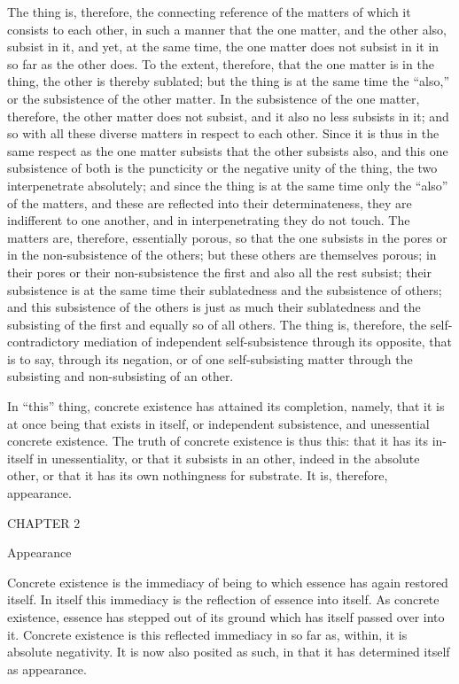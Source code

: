 The thing is, therefore, the connecting reference of the matters
of which it consists to each other, in such a manner
that the one matter, and the other also, subsist in it,
and yet, at the same time, the one matter does not subsist
in it in so far as the other does.
To the extent, therefore, that the one matter is in the thing,
the other is thereby sublated; but the thing is at the same
time the “also,” or the subsistence of the other matter.
In the subsistence of the one matter, therefore, the other matter does not subsist,
and it also no less subsists in it;
and so with all these diverse matters in respect to each other.
Since it is thus in the same respect as the one matter subsists that the
other subsists also, and this one subsistence of both is the puncticity or
the negative unity of the thing, the two interpenetrate absolutely;
and since the thing is at the same time only the “also” of the matters,
and these are reflected into their determinateness,
they are indifferent to one another, and
in interpenetrating they do not touch.
The matters are, therefore, essentially porous,
so that the one subsists in the pores
or in the non-subsistence of the others;
but these others are themselves porous;
in their pores or their non-subsistence
the first and also all the rest subsist;
their subsistence is at the same time
their sublatedness and the subsistence of others;
and this subsistence of the others is
just as much their sublatedness
and the subsisting of the first
and equally so of all others.
The thing is, therefore,
the self-contradictory mediation of
independent self-subsistence through its opposite,
that is to say, through its negation,
or of one self-subsisting matter
through the subsisting and non-subsisting of an other.

In “this” thing, concrete existence has attained its completion,
namely, that it is at once being that exists in itself,
or independent subsistence, and unessential concrete existence.
The truth of concrete existence is thus this:
that it has its in-itself in unessentiality,
or that it subsists in an other,
indeed in the absolute other,
or that it has its own nothingness for substrate.
It is, therefore, appearance.

CHAPTER 2

Appearance

Concrete existence is the immediacy of being
to which essence has again restored itself.
In itself this immediacy is the reflection of essence into itself.
As concrete existence, essence has stepped out of its ground
which has itself passed over into it.
Concrete existence is this reflected immediacy in so far
as, within, it is absolute negativity.
It is now also posited as such,
in that it has determined itself as appearance.

